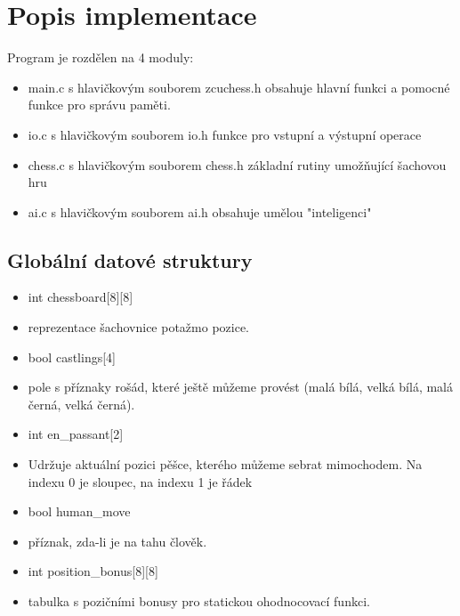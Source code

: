 \documentclass[11pt, titlepage]{article}
\begin{document}
\section{Popis implementace}

Program je rozdělen na 4 moduly:
\begin{itemize}
	\item main.c s hlavičkovým souborem zcuchess.h obsahuje hlavní funkci a pomocné funkce pro správu paměti.
	\item io.c s hlavičkovým souborem io.h funkce pro vstupní a výstupní operace
	\item chess.c s hlavičkovým souborem chess.h základní rutiny umožňující šachovou hru
	\item ai.c s hlavičkovým souborem ai.h obsahuje umělou "inteligenci"
\end{itemize}

\subsection{Globální datové struktury}
\begin{itemize}
	\item int chessboard[8][8]\item reprezentace šachovnice potažmo pozice.
	\item bool castlings[4]\item pole s příznaky rošád, které ještě můžeme provést (malá bílá, velká bílá, malá černá, velká černá).
	\item int en\_passant[2]\item Udržuje aktuální pozici pěšce, kterého můžeme sebrat mimochodem. Na indexu 0 je sloupec, na indexu 1 je řádek
	\item bool human\_move\item příznak, zda-li je na tahu člověk.
	\item int position\_bonus[8][8]\item tabulka s pozičními bonusy pro statickou ohodnocovací funkci.
\end{itemize}
\end{document}

